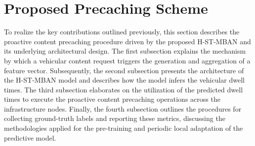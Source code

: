 \documentclass[journal]{IEEEtran}
\begin{document}
\section{Proposed Precaching Scheme} \label{sec:architecture}
To realize the key contributions outlined previously, this section describes the proactive content precaching procedure driven by the proposed H-ST-MBAN and its underlying architectural design.
The first subsection explains the mechanism by which a vehicular content request triggers the generation and aggregation of a feature vector.
Subsequently, the second subsection presents the architecture of the H-ST-MBAN model and describes how the model infers the vehicular dwell times.
The third subsection elaborates on the utilization of the predicted dwell times to execute the proactive content precaching operations across the infrastructure nodes.
Finally, the fourth subsection outlines the procedures for collecting ground-truth labels and reporting these metrics, discussing the methodologies applied for the pre-training and periodic local adaptation of the predictive model.
\end{document}
